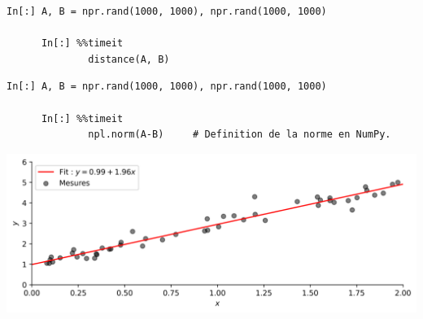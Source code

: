 \documentclass[aspectratio=169]{beamer}
\begin{document}
{
  \begin{frame}[fragile]{}{}
    \vfill
    \begin{lstlisting}[backgroundcolor=\color{white}, basicstyle=\ttfamily\footnotesize\color{black}]
      In[:] A, B = npr.rand(1000, 1000), npr.rand(1000, 1000)
      
      In[:] %%timeit
              distance(A, B)
    \end{lstlisting}
    \hspace{1cm}
    \footnotesize{\texttt{}}
    
    \vfill
  \end{frame}
}

{
  \begin{frame}[fragile]{}{}
    \vfill
    \begin{lstlisting}[backgroundcolor=\color{white}, basicstyle=\ttfamily\footnotesize\color{black}]
      In[:] A, B = npr.rand(1000, 1000), npr.rand(1000, 1000)
      
      In[:] %%timeit
              npl.norm(A-B)     # Definition de la norme en NumPy.
    \end{lstlisting}
    \hspace{1cm}
    \footnotesize{\texttt{}}
    
    \vfill
  \end{frame}
}





{
  \begin{frame}[fragile]{}{}
    \vfill
    \centering
    \includegraphics[width=\textwidth]{least_squares_ex}
    \vfill
  \end{frame}
}
\end{document}
